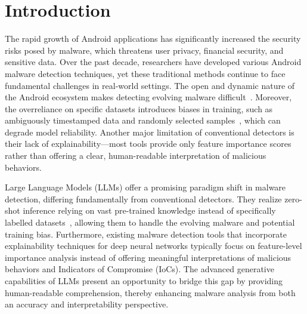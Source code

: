 \section{Introduction}
The rapid growth of Android applications has significantly increased the security risks posed by malware, which threatens user privacy, financial security, and sensitive data. Over the past decade, researchers have developed various Android malware detection techniques, yet these traditional methods continue to face fundamental challenges in real-world settings. The open and dynamic nature of the Android ecosystem makes detecting evolving malware difficult~\cite{transcend, transcending}. Moreover, the overreliance on specific datasets introduces biases in training, such as ambiguously timestamped data and randomly selected samples~\cite{tesseract}, which can degrade model reliability. Another major limitation of conventional detectors is their lack of explainability—most tools provide only feature importance scores rather than offering a clear, human-readable interpretation of malicious behaviors.

Large Language Models (LLMs) offer a promising paradigm shift in malware detection, differing fundamentally from conventional detectors. They realize zero-shot inference relying on vast pre-trained knowledge instead of specifically labelled datasets~\cite{large_zero,toolformer}, allowing them to handle the evolving malware and potential training bias. Furthermore, existing malware detection tools that incorporate explainability techniques for deep neural networks typically focus on feature-level importance analysis instead of offering meaningful interpretations of malicious behaviors and Indicators of Compromise (IoCs). The advanced generative capabilities of LLMs present an opportunity to bridge this gap by providing human-readable comprehension, thereby enhancing malware analysis from both an accuracy and interpretability perspective.


